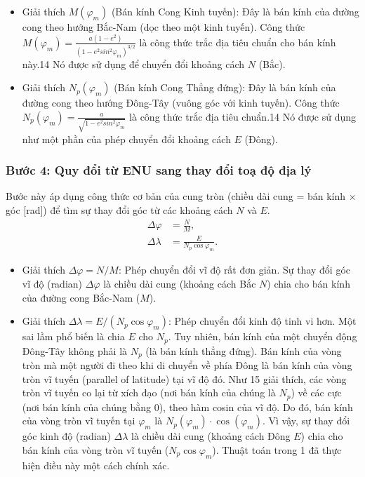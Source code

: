\begin{itemize}
    \item Giải thích $M(\varphi_m)$ (Bán kính Cong Kinh tuyến): Đây là bán kính của đường cong theo hướng Bắc-Nam (dọc theo một kinh tuyến). Công thức $M(\varphi_{m})=\frac{a(1-e^{2})}{(1-e^{2}sin^{2}\varphi_{m})^{3/2}}$ là công thức trắc địa tiêu chuẩn cho bán kính này.14 Nó được sử dụng để chuyển đổi khoảng cách $N$ (Bắc).
    \item Giải thích $N_p(\varphi_m)$ (Bán kính Cong Thẳng đứng): Đây là bán kính của đường cong theo hướng Đông-Tây (vuông góc với kinh tuyến). Công thức $N_{p}(\varphi_{m})=\frac{a}{\sqrt{1-e^{2}sin^{2}\varphi_{m}}}$ là công thức trắc địa tiêu chuẩn.14 Nó được sử dụng như một phần của phép chuyển đổi khoảng cách $E$ (Đông).

\end{itemize}



\subsubsection{Bước 4: Quy đổi từ ENU sang thay đổi toạ độ địa lý}
Bước này áp dụng công thức cơ bản của cung tròn (chiều dài cung = bán kính $\times$ góc [rad]) để tìm sự thay đổi góc từ các khoảng cách $N$ và $E$.
\[
\begin{aligned}
    \Delta\varphi &= \frac{N}{M}, \\
    \Delta\lambda &= \frac{E}{N_p \cos\varphi_m}.
\end{aligned}
\]
\begin{itemize}
    \item Giải thích $\Delta\varphi = N / M$:
Phép chuyển đổi vĩ độ rất đơn giản. Sự thay đổi góc vĩ độ (radian) $\Delta\varphi$ là chiều dài cung (khoảng cách Bắc $N$) chia cho bán kính của đường cong Bắc-Nam ($M$).
    \item Giải thích $\Delta\lambda = E / (N_{p} \cos \varphi_{m})$:
Phép chuyển đổi kinh độ tinh vi hơn. Một sai lầm phổ biến là chia $E$ cho $N_p$. Tuy nhiên, bán kính của một chuyển động Đông-Tây không phải là $N_p$ (là bán kính thẳng đứng). Bán kính của vòng tròn mà một người đi theo khi di chuyển về phía Đông là bán kính của vòng tròn vĩ tuyến (parallel of latitude) tại vĩ độ đó.
Như 15 giải thích, các vòng tròn vĩ tuyến co lại từ xích đạo (nơi bán kính của chúng là $N_p$) về các cực (nơi bán kính của chúng bằng 0), theo hàm cosin của vĩ độ.
Do đó, bán kính của vòng tròn vĩ tuyến tại $\varphi_m$ là $N_p(\varphi_m) \cdot \cos(\varphi_m)$.
Vì vậy, sự thay đổi góc kinh độ (radian) $\Delta\lambda$ là chiều dài cung (khoảng cách Đông $E$) chia cho bán kính của vòng tròn vĩ tuyến ($N_p \cos \varphi_m$). Thuật toán trong 1 đã thực hiện điều này một cách chính xác.

\end{itemize}

